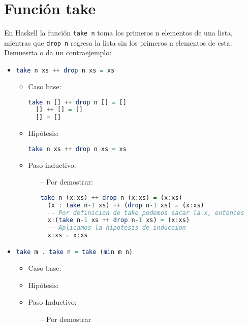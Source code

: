 \documentclass[spanish,12pt,letterpaper]{article}
\begin{document}
\section{Función take}
En Haskell la función \texttt{take n} toma los primeros n elementos de una lista,
mientras que \texttt{drop n} regresa la lista sin los primeros n elementos de
esta. Demuesrta o da un contraejemplo:
\begin{itemize}
\item
  \begin{lstlisting}[language=Haskell]
  take n xs ++ drop n xs = xs \end{lstlisting}
	\begin{itemize}
	\item Caso base: \\
	\begin{lstlisting}[language=Haskell]
  take n [] ++ drop n [] = []
  [] ++ [] = []
  [] = [] \end{lstlisting}

	\item Hipótesis:
	\begin{lstlisting}[language=Haskell]
  take n xs ++ drop n xs = xs \end{lstlisting}

  	\item Paso inductivo:
  	\begin{itemize}
  		\item[--] Por demostrar:
	\begin{lstlisting}[language=Haskell]
  take n (x:xs) ++ drop n (x:xs) = (x:xs)
  (x : take n-1 xs) ++ (drop n-1 xs) = (x:xs)
  -- Por definicion de take podemos sacar la x, entonces
  x:(take n-1 xs ++ drop n-1 xs) = (x:xs)
  -- Aplicamos la hipotesis de induccion
  x:xs = x:xs  	\end{lstlisting}
  	\end{itemize}
	\end{itemize}

\item
  \begin{lstlisting}[language=Haskell]
    take m . take n = take (min m n)
  \end{lstlisting}
  \begin{itemize}
  \item Caso base:
  \item Hipótesis:
  \item Paso Inductivo:
  	\begin{itemize}
  	\item[--] Por demostrar
  	\end{itemize}
  \end{itemize}


\end{itemize}
\end{document}
